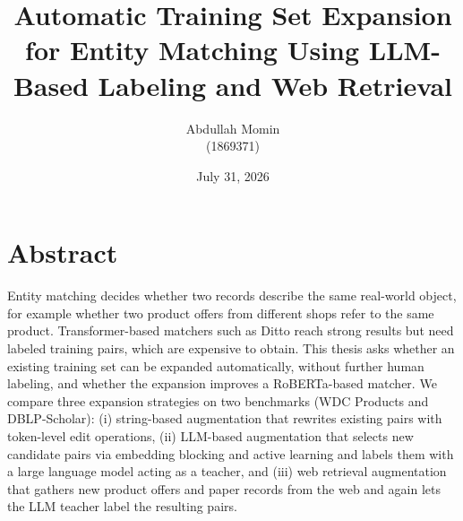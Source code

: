 \documentclass[a4paper,oneside,bibliography=totoc]{scrbook}
\begin{document}
\frontmatter \subject{Master Thesis}
\title{Automatic Training Set Expansion for Entity Matching Using LLM-Based Labeling and Web Retrieval}
\author{Abdullah Momin\\
  (1869371)} \date{July 31, 2026}
\publishers{{\small Submitted to}\\
  Data and Web Science Group\\
  Prof.\ Dr.\ Christian Bizer\\
  University of Mannheim\\}
\maketitle

\chapter{Abstract}

Entity matching decides whether two records describe the same real-world object, for example whether two product offers from different shops refer to the same product. Transformer-based matchers such as Ditto reach strong results but need labeled training pairs, which are expensive to obtain. This thesis asks whether an existing training set can be expanded automatically, without further human labeling, and whether the expansion improves a RoBERTa-based matcher. We compare three expansion strategies on two benchmarks (WDC Products and DBLP-Scholar): (i) string-based augmentation that rewrites existing pairs with token-level edit operations, (ii) LLM-based augmentation that selects new candidate pairs via embedding blocking and active learning and labels them with a large language model acting as a teacher, and (iii) web retrieval augmentation that gathers new product offers and paper records from the web and again lets the LLM teacher label the resulting pairs.
\end{document}
